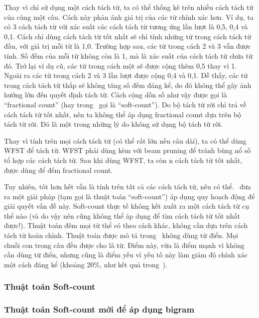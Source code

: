 \documentclass[a4paper,oneside,14pt]{extbook} %
\begin{document}
Thay vì chỉ sử dụng một cách tách từ, ta có thể thống kê trên nhiều
cách tách từ của cùng một câu. Cách này phản ánh
giá trị của các từ chính xác hơn. Ví dụ, ta có 3 cách tách từ với xác
suất các cách tách từ tương ứng lần lượt là 0,5, 0,4 và 0,1. Cách chỉ
dùng cách tách từ tốt nhất sẽ chỉ tính những từ trong cách tách từ
đầu, với giá trị mỗi từ là 1,0. 
Trường hợp sau, các từ trong cách 2 và 3 vẫn được
tính. Số đếm của mỗi từ không còn là 1, mà là xác suất của cách tách
từ chứa từ đó. Trở lại ví dụ cũ, các từ trong cách một sẽ được cộng thêm
0,5 thay vì 1. Ngoài ra các từ trong cách 2 và 3 lần lượt được cộng
0,4 và 0,1. Dễ thấy, các từ trong cách tách từ thấp sẽ không tăng số
đếm đáng kể, do đó không thể gây ảnh hưởng lớn đến quyết định tách
từ.
Cách cộng dồn số như vậy được gọi là ``fractional count'' (hay
trong~\cite{softcount} gọi là ``soft-count''). Do bộ tách từ rời chỉ
trả về cách tách từ tốt nhất, nên ta không thể áp dụng fractional
count dựa trên bộ tách từ rời. Đó là một trong những lý do không sử
dụng bộ tách từ rời.

Thay vì tính trên mọi cách tách từ (có thể rất lớn nếu câu dài), ta có
thể dùng WFST
 để tách  
từ. WFST phải dùng kèm với beam pruning để tránh bùng nổ số tổ hợp các
cách tách từ. Sau khi dùng WFST, ta còn n cách tách từ tốt nhất, được
dùng để đếm fractional count.


Tuy nhiên, tốt hơn hết vẫn là tính trên tất cả các cách tách từ, nếu có
thể. \cite{softcount}~đưa ra một giải pháp (tạm gọi là thuật toán
``soft-count'') áp dụng quy hoạch động để giải quyết vấn đề này.
Soft-count thực tế không kết xuất ra một cách tách từ cụ thể nào (và
do vậy nên 
cũng không thể áp dụng để tìm cách tách từ tốt nhất được!). Thuật toán
đếm mọi từ thể có theo cách khác, không cần dựa trên cách tách từ hoàn
chỉnh. Thuật toán được mô tả trong~\cite{softcount} không dùng từ điển. Mọi chuỗi con trong câu đều được
cho là từ. Điểm này, vừa là điểm mạnh vì không cần dùng từ
điển, nhưng cũng là điểm yếu vì yếu tố này làm giảm độ chính xác một
cách đáng kể (khoảng 20\%, như kết quả trong~\cite{softcount}).


\subsubsection{Thuật toán Soft-count}


\subsubsection{Thuật toán Soft-count mới để áp dụng bigram}
\end{document}
